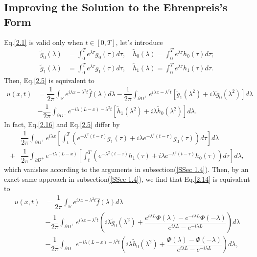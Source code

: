 \documentclass[12pt]{article}
\numberwithin{equation}{section}
\begin{document}
\subsection{Improving the Solution to the Ehrenpreis's Form}
Eq.\eqref{2.1} is valid only when $t\in[0,T]$, let's introduce 
\begin{equation}
    \begin{split}
        \tilde{g}_0(\lambda)&=\int_{0}^{T} e^{\lambda \tau}g_0(\tau)d\tau,\quad \tilde{h}_0(\lambda)=\int_{0}^{T} e^{\lambda\tau} h_0(\tau)d\tau;\\
        \tilde{g}_1(\lambda)&=\int_{0}^{T} e^{\lambda \tau}g_1(\tau)d\tau,\quad \tilde{h}_1(\lambda)=\int_{0}^{T} e^{\lambda\tau} h_1(\tau)d\tau.
    \end{split}
\end{equation}
Then, Eq.\eqref{2.5} is equivalent to 
\begin{equation}\label{2.16}
    \begin{split}
    u(x,t)&=\dfrac{1}{2\pi}\int_{\mathbb{R}} e^{i\lambda x-\lambda^2 t} \hat{f}(\lambda)d\lambda-\dfrac{1}{2\pi}\int_{\partial D^+} e^{i\lambda x-\lambda^2 t}[\tilde{g}_1(\lambda^2)+i\lambda\tilde{g}_0(\lambda^2)]d\lambda\\
        &-\dfrac{1}{2\pi}\int_{\partial D^-} e^{-i\lambda(L-x)-\lambda^2 t}[\tilde{h}_1(\lambda^2)+i\lambda\tilde{h}_0(\lambda^2)]d\lambda.
    \end{split}
\end{equation}
In fact, Eq.\eqref{2.16} and Eq.\eqref{2.5} differ by 
\begin{equation}
    \begin{split}
        &\dfrac{1}{2\pi}\int_{\partial D^+} e^{i\lambda x}\left[ \int_{t}^{T} \left(e^{-\lambda^2(t-\tau)}g_1(\tau)+i\lambda e^{-\lambda^2(t-\tau)}g_0(\tau)\right)d\tau \right]d\lambda\\
        +&\dfrac{1}{2\pi}\int_{\partial D^+} e^{-i\lambda (L-x)}\left[ \int_{t}^{T} \left(e^{-\lambda^2(t-\tau)}h_1(\tau)+i\lambda e^{-\lambda^2(t-\tau)}h_0(\tau)\right)d\tau \right]d\lambda,
    \end{split}
\end{equation}
which vanishes according to the arguments in subsection(\ref{SSec 1.4}). Then, by an exact same approach in subsection(\ref{SSec 1.4}), we find that Eq.\eqref{2.14} is equivalent to 
\begin{equation}\label{2.18}
    \begin{split}
        u(x,t)&=\dfrac{1}{2\pi}\int_{\mathbb{R}} e^{i\lambda x-\lambda^2 t} \hat{f}(\lambda)d\lambda\\
        &-\dfrac{1}{2\pi}\int_{\partial D^+} e^{i\lambda x-\lambda^2t} \left(i\lambda\tilde{g}_0(\lambda^2)+\dfrac{e^{i\lambda L}\Phi(\lambda)-e^{-i\lambda L}\Phi(-\lambda)}{e^{i\lambda L}-e^{-i\lambda L}}\right)d\lambda\\
        &-\dfrac{1}{2\pi}\int_{\partial D^-} e^{-i\lambda(L-x)-\lambda^2 t}\left(i\lambda\tilde{h}_0(\lambda^2)+\dfrac{\Phi(\lambda)-\Phi(-\lambda)}{e^{i\lambda L}-e^{-i\lambda L}}\right)d\lambda,
    \end{split}
\end{equation}
\end{document}
